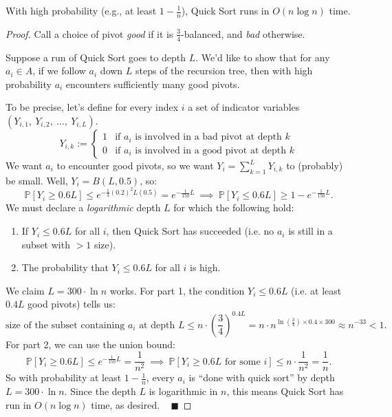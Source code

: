 \begin{claim}
    With high probability (e.g., at least $1 - \frac{1}{n}$), Quick Sort runs in $O(n \log n)$ time.
\end{claim}

\begin{proof}
    Call a choice of pivot \emph{good} if it is $\frac{3}{4}$-balanced, and \emph{bad} otherwise.

    Suppose a run of Quick Sort goes to depth $L$.  We'd like to show that for any $a_i \in A$, if we follow $a_i$ down $L$ steps of the recursion tree, then with high probability $a_i$ encounters sufficiently many good pivots.
    
    To be precise, let's define for every index $i$ a set of indicator variables $(Y_{i, 1}, \ Y_{i, 2}, \ \dots, \ Y_{i, L})$.
    \[ Y_{i, k} := \begin{cases}
    1 & \text{if } a_i \text{ is involved in a bad pivot at depth } k \\
    0 & \text{if } a_i \text{ is involved in a good pivot at depth } k
    \end{cases} \]
    We want $a_i$ to encounter good pivots, so we want $Y_i = \sum_{k = 1}^L Y_{i, k}$ to (probably) be small.  Well, $Y_i = B(L, 0.5)$, so:
    \[ \mathbb{P}[Y_i \geq 0.6L] \leq e^{-\frac{1}{3} (0.2)^2 L (0.5)} = e^{-\frac{1}{150}L} ~ \implies ~ \mathbb{P}[Y_i \leq 0.6L] \geq 1 - e^{-\frac{1}{150}L}. \]
    We must declare a \emph{logarithmic} depth $L$ for which the following hold:
    \begin{enumerate}
        \item If $Y_i \leq 0.6L$ for all $i$, then Quick Sort has succeeded (i.e. no $a_i$ is still in a subset with $>1$ size).
        \item The probability that $Y_i \leq 0.6L$ for all $i$ is high.
    \end{enumerate}
    We claim $L = 300 \cdot \ln n$ works.  For part 1, the condition $Y_i \leq 0.6L$ (i.e. at least $0.4L$ good pivots) tells us:
    \[ \text{size of the subset containing } a_i \text{ at depth } L \leq n \cdot \left(\dfrac{3}{4}\right)^{0.4L} = n \cdot n^{\ln \left(\frac{3}{4}\right) \times 0.4 \times 300} \approx n^{-33} < 1. \]
    For part 2, we can use the union bound:
    \[ \mathbb{P}[Y_i \geq 0.6L] \leq e^{-\frac{1}{150}L} = \dfrac{1}{n^2} ~ \implies ~  \mathbb{P}[Y_i \geq 0.6L \text{ for some } i] \leq n \cdot \dfrac{1}{n^2} = \dfrac{1}{n}. \]
    So with probability at least $1 - \frac{1}{n}$, every $a_i$ is ``done with quick sort'' by depth $L = 300 \cdot \ln n$.  Since the depth $L$ is logarithmic in $n$, this means Quick Sort has run in $O(n \log n)$ time, as desired. ~ $\blacksquare$
\end{proof}

